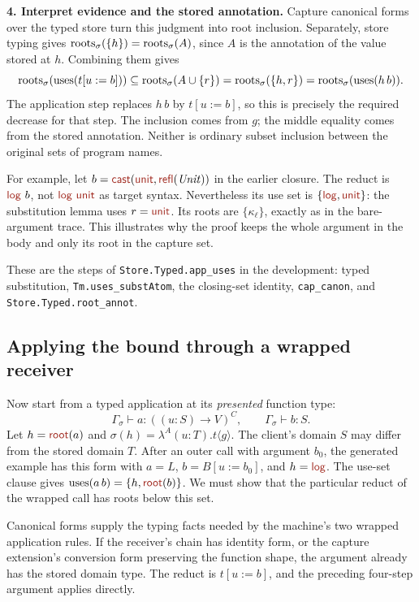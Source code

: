 \textbf{4. Interpret evidence and the stored annotation.}
Capture canonical forms over the typed store turn this judgment into
root inclusion. Separately, store typing gives
$\operatorname{roots}_{\sigma}(\{h\})=\operatorname{roots}_{\sigma}(A)$, since $A$ is the annotation of the value
stored at $h$. Combining them gives
\[
 \operatorname{roots}_{\sigma}(\operatorname{uses}(t[u:=b]))
 \subseteq\operatorname{roots}_{\sigma}(A\cup\{r\})
 =\operatorname{roots}_{\sigma}(\{h,r\})
 =\operatorname{roots}_{\sigma}(\operatorname{uses}(h\,b)).
\]
The application step replaces $h\,b$ by $t[u:=b]$, so this is precisely
the required decrease for that step. The inclusion comes from $g$;
the middle equality comes from the stored annotation. Neither is
ordinary subset inclusion between the original sets of program names.

For example, let $b=\cast{\ev{unit}}{\ev{refl}(\ty{Unit})}$ in the
earlier closure. The reduct is $\ev{log}\ b$, not
$\ev{log}\ \ev{unit}$ as target syntax. Nevertheless its use set is
$\{\ev{log},\ev{unit}\}$: the substitution lemma uses
$r=\ev{unit}$. Its roots are $\{\kappa_\ell\}$, exactly as in the
bare-argument trace. This illustrates why the proof keeps the whole
argument in the body and only its root in the capture set.

These are the steps of \texttt{Store.Typed.app\_uses} in the development:
typed substitution, \texttt{Tm.uses\_substAtom}, the closing-set identity,
\texttt{cap\_canon}, and \texttt{Store.Typed.root\_annot}.

\subsection*{Applying the bound through a wrapped receiver}
Now start from a typed application at its \emph{presented} function type:
\[
 \Gamma_\sigma\vdash a:((u:S)\to V)^C,\qquad
 \Gamma_\sigma\vdash b:S.
\]
Let $h=\ev{root}(a)$ and
$\sigma(h)=\lambda^A(u:T).t\langle g\rangle$.
The client's domain $S$ may differ from the stored domain $T$.
After an outer call with argument $b_0$, the generated example has this
form with $a=L$, $b=B[u:=b_0]$, and $h=\ev{log}$.
The use-set clause gives
$\uses{a\,b}=\{h,\ev{root}(b)\}$. We must show that the particular
reduct of the wrapped call has roots below this set.

Canonical forms supply the typing facts needed by the machine's two
wrapped application rules. If the receiver's chain has identity form,
or the capture extension's conversion form preserving the function
shape, the argument already has the stored domain type. The reduct is
$t[u:=b]$, and the preceding four-step argument applies directly.

